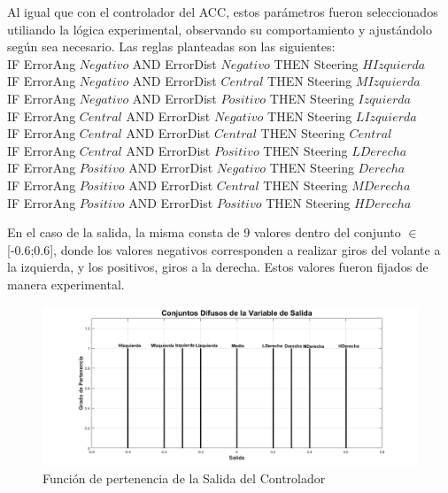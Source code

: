 \par Al igual que con el controlador del ACC, estos parámetros fueron seleccionados utiliando la lógica experimental, observando su comportamiento y ajustándolo según sea necesario. Las reglas planteadas son las siguientes:\\

	\hspace*{2pt}IF ErrorAng $Negativo$ AND ErrorDist $Negativo$ THEN Steering $HIzquierda$\\
	\hspace*{20pt}IF ErrorAng $Negativo$ AND ErrorDist $Central$ THEN Steering $MIzquierda$\\
	\hspace*{20pt}IF ErrorAng $Negativo$ AND ErrorDist $Positivo$ THEN Steering $Izquierda$\\
	\hspace*{20pt}IF ErrorAng $Central$ AND ErrorDist $Negativo$ THEN Steering $LIzquierda$\\
	\hspace*{20pt}IF ErrorAng $Central$ AND ErrorDist $Central$ THEN Steering $Central$\\
	\hspace*{20pt}IF ErrorAng $Central$ AND ErrorDist $Positivo$ THEN Steering $LDerecha$\\
	\hspace*{20pt}IF ErrorAng $Positivo$ AND ErrorDist $Negativo$ THEN Steering $Derecha$\\
	\hspace*{20pt}IF ErrorAng $Positivo$ AND ErrorDist $Central$ THEN Steering $MDerecha$\\
	\hspace*{20pt}IF ErrorAng $Positivo$ AND ErrorDist $Positivo$ THEN Steering $HDerecha$\\

\par En el caso de la salida, la misma consta de 9 valores dentro del conjunto $\in$ [-0.6;0.6], donde los valores negativos corresponden a realizar giros del volante a la izquierda, y los positivos, giros a la derecha. Estos valores fueron fijados de manera experimental.\\ 

\begin{figure}[!h]
	\centering
		\includegraphics[scale=0.32]{Imagenes/clsal}
		\caption{Función de pertenencia de la Salida del Controlador}
		\label{fig:clsal}
\end{figure}	 

